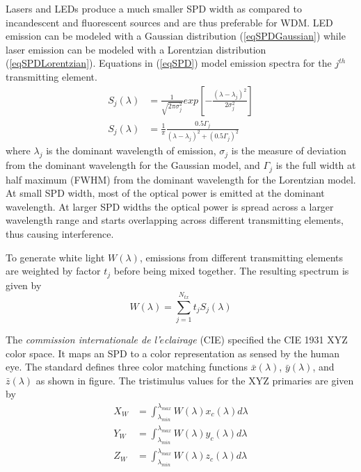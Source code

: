 Lasers and LEDs produce a much smaller SPD width as compared to incandescent and fluorescent sources and are thus preferable for WDM. LED emission can be modeled with a Gaussian distribution (\ref{eqSPDGaussian}) while laser emission can be modeled with a Lorentzian distribution (\ref{eqSPDLorentzian}). Equations in (\ref{eqSPD}) model emission spectra for the $j^{th}$ transmitting element.
\setlength{\arraycolsep}{0.0em}
\begin{subequations}
\begin{align}
S_j(\lambda) &= \frac{1}{\sqrt{2\pi\sigma_j^2}}exp\left[-\frac{(\lambda-\lambda_j)^2}{2\sigma_j^2}\right]\label{eqSPDGaussian}\\
S_j(\lambda) &= \frac{1}{\pi}\frac{0.5\Gamma_j}{(\lambda-\lambda_j)^2 + (0.5\Gamma_j)^2}\label{eqSPDLorentzian}
\end{align}
\label{eqSPD}
\end{subequations}
\setlength{\arraycolsep}{5pt}
where $\lambda_j$ is the dominant wavelength of emission, $\sigma_j$ is the measure of deviation from the dominant wavelength for the Gaussian model, and $\Gamma_j$ is the full width at half maximum (FWHM) from the dominant wavelength for the Lorentzian model. At small SPD width, most of the optical power is emitted at the dominant wavelength. At larger SPD widths the optical power is spread across a larger wavelength range and starts overlapping across different transmitting elements, thus causing interference.

To generate white light $W(\lambda)$, emissions from different transmitting elements are weighted by factor $t_j$ before being mixed together. The resulting spectrum is given by
\begin{equation}
	\label{eqWhite}
	W(\lambda) = \sum_{j=1}^{N_{tx}}t_jS_j(\lambda)
\end{equation}

The \textit{commission internationale de l'$\acute{e}$clairage} (CIE) specified the CIE 1931 XYZ color space. It maps an SPD to a color representation as sensed by the human eye. The standard defines three color matching functions $\bar{x}(\lambda)$, $\bar{y}(\lambda)$, and $\bar{z}(\lambda)$ as shown in {\color{red}figure}. The tristimulus values for the XYZ primaries are given by
\setlength{\arraycolsep}{0.0em}
\begin{subequations}
\begin{align}
X_W &= \int_{\lambda_{min}}^{\lambda_{max}}W(\lambda)x_c(\lambda)d\lambda\\
Y_W &= \int_{\lambda_{min}}^{\lambda_{max}}W(\lambda)y_c(\lambda)d\lambda\\
Z_W &= \int_{\lambda_{min}}^{\lambda_{max}}W(\lambda)z_c(\lambda)d\lambda
\end{align}
\label{eqTriStimulus}
\end{subequations}
\setlength{\arraycolsep}{5pt}


